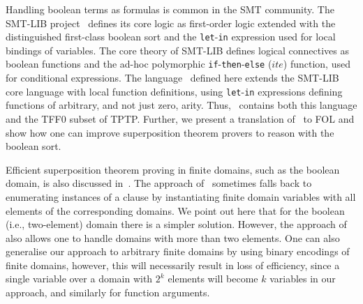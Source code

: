 Handling boolean terms as formulas is common in the SMT community. The SMT-LIB project~\cite{SMT-LIB} defines its core logic as first-order logic extended with the distinguished first-class boolean sort and the \verb'let'-\verb'in' expression used for local bindings of variables. The core theory of SMT-LIB defines logical connectives as boolean functions and the ad-hoc polymorphic \verb'if'-\verb'then'-\verb'else' ($ite$) function, used for conditional expressions. 
The language \folb\ defined here extends the SMT-LIB core language with local function definitions,
using \verb'let'-\verb'in' expressions defining functions of arbitrary, and not just zero, arity. Thus, \folb\ contains both this language and the TFF0 subset of TPTP. Further, we present a translation of \folb\ to FOL and show how one can improve superposition theorem provers to reason with the boolean sort. 


Efficient superposition theorem proving in finite domains, such as the boolean domain, is also discussed in~\cite{HillenbrandWeidenbach13}. The approach of~\cite{HillenbrandWeidenbach13} sometimes falls back to enumerating instances of a clause by instantiating finite domain variables with all elements of the corresponding domains. We point out here that for the boolean (i.e., two-element) domain there is a simpler solution. However, the approach of~\cite{HillenbrandWeidenbach13} also allows one to handle domains with more than two elements. One can also generalise our approach to arbitrary finite domains by using binary encodings of finite domains, however, this will necessarily result in loss of efficiency, since a single variable over a domain with $2^k$ elements will become $k$ variables in our approach, and similarly for function arguments.
